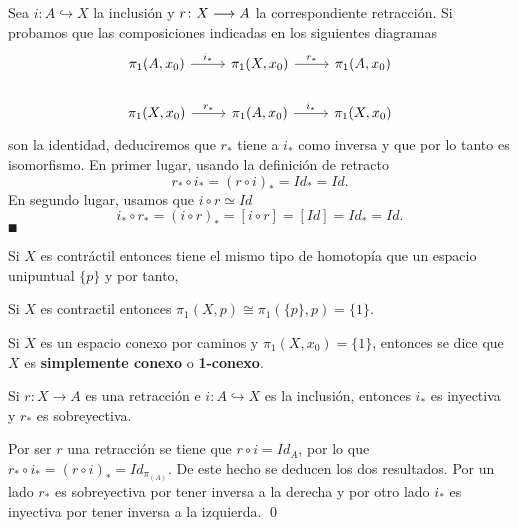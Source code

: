 \documentclass[GTS.tex]{subfiles}
\begin{document}
\begin{dem}
Sea $i:A\hookrightarrow X$ la inclusión y $r\colon{X}\longrightarrow{A}$ la correspondiente retracción. Si probamos que las composiciones indicadas en los siguientes diagramas
\[
\begin{tikzcd}
\pi_1(A,x_0)\arrow[r, "i_*"] & \pi_1(X,x_0)\arrow[r, "r_*"] & \pi_1(A,x_0)\\
\pi_1(X,x_0)\arrow[r, "r_*"] & \pi_1(A,x_0)\arrow[r, "i_*"] & \pi_1(X,x_0)
\end{tikzcd}
\]
son la identidad, deduciremos que $r_*$ tiene a $i_*$ como inversa y que por lo tanto es isomorfismo. En primer lugar, usando la definición de retracto
\[
r_*\circ i_*=(r\circ i)_*=Id_*=Id.
\]
En segundo lugar, usamos que $i\circ r\simeq Id$
\[
i_*\circ r_*=(i\circ r)_*=[i\circ r]=[Id]=Id_*=Id.
\]$\QED$
\end{dem}
Si $X$ es contráctil entonces tiene el mismo tipo de homotopía que un espacio unipuntual  $\{p\}$ y por tanto, 
\begin{coro}
Si $X$ es contractil entonces $\pi_1(X,p) \cong \pi_1(\{p\},p) = \{1\}$.  
\end{coro}

\begin{defi} Si $X$ es un espacio conexo por caminos y $\pi_1(X,x_0)=\{1\}$, entonces se dice que $X$ es \textbf{simplemente conexo} o \textbf{1-conexo}.
\end{defi}

\begin{ejer}
Si $r:X\to A$ es una retracción e $i:A\hookrightarrow X$ es la inclusión, entonces $i_*$ es inyectiva y $r_*$ es sobreyectiva.
\end{ejer}
\begin{solucion}
Por ser $r$ una retracción se tiene que $r\circ i =Id_A$, por lo que $r_*\circ i_*=(r\circ i)_*=Id_{\pi_(A)}$. De este hecho se deducen los dos resultados. Por un lado $r_*$ es sobreyectiva por tener inversa a la derecha y por otro lado $i_*$ es inyectiva por tener inversa a la izquierda. \qed
\end{solucion}
\end{document}
